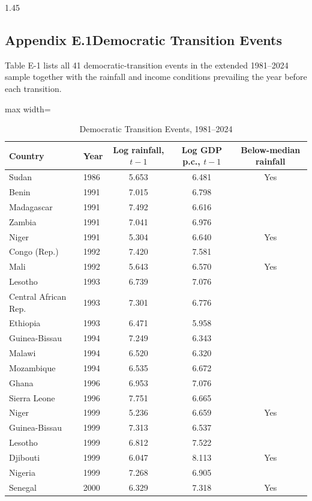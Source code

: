 \documentclass[12pt]{article}
\begin{document}
\begin{bibunit}[jpe]
\begin{spacing}{1.45}
\subsection*{Appendix E.1\quad Democratic Transition Events}

Table E-1 lists all 41 democratic-transition events in the extended 1981--2024 sample together with the rainfall and income conditions prevailing the year before each transition.

\begin{table}[H]
\centering
\begin{adjustbox}{max width=\textwidth}
\begin{threeparttable}
\caption{Democratic Transition Events, 1981--2024}
\label{tab:E1}
\begin{tabular}{llccc}
\toprule
Country & Year & Log rainfall, $t-1$ & Log GDP p.c., $t-1$ & Below-median rainfall \\
\midrule
Sudan & 1986 & 5.653 & 6.481 & Yes \\
Benin & 1991 & 7.015 & 6.798 & \\
Madagascar & 1991 & 7.492 & 6.616 & \\
Zambia & 1991 & 7.041 & 6.976 & \\
Niger & 1991 & 5.304 & 6.640 & Yes \\
Congo (Rep.) & 1992 & 7.420 & 7.581 & \\
Mali & 1992 & 5.643 & 6.570 & Yes \\
Lesotho & 1993 & 6.739 & 7.076 & \\
Central African Rep.\ & 1993 & 7.301 & 6.776 & \\
Ethiopia & 1993 & 6.471 & 5.958 & \\
Guinea-Bissau & 1994 & 7.249 & 6.343 & \\
Malawi & 1994 & 6.520 & 6.320 & \\
Mozambique & 1994 & 6.535 & 6.672 & \\
Ghana & 1996 & 6.953 & 7.076 & \\
Sierra Leone & 1996 & 7.751 & 6.665 & \\
Niger & 1999 & 5.236 & 6.659 & Yes \\
Guinea-Bissau & 1999 & 7.313 & 6.537 & \\
Lesotho & 1999 & 6.812 & 7.522 & \\
Djibouti & 1999 & 6.047 & 8.113 & Yes \\
Nigeria & 1999 & 7.268 & 6.905 & \\
Senegal & 2000 & 6.329 & 7.318 & Yes \\

\end{tabular}
\end{threeparttable}
\end{adjustbox}
\end{table}
\end{spacing}
\end{bibunit}
\end{document}

